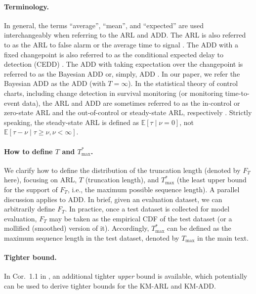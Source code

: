 \documentclass{article}
\theoremstyle{plain}
\theoremstyle{definition}
\theoremstyle{remark}
\def\mbe{\mathbb{E}}
\begin{document}
\paragraph{Terminology.}
In general, the terms ``average'', ``mean'', and ``expected'' are used interchangeably when referring to the ARL and ADD. 
The ARL is also referred to as the ARL to false alarm \citep{tartakovsky2019sequential_TartarBookQCD} or the average time to signal \citep{li2014computation}.
The ADD with a fixed changepoint is also referred to as the conditional expected delay to detection (CEDD) \citep{tartakovsky2019sequential_TartarBookQCD}.
The ADD with taking expectation over the changepoint is referred to as the Bayesian ADD or, simply, ADD \citep{tartakovsky2019sequential_TartarBookQCD}.
In our paper, we refer the Bayesian ADD as the ADD (with $T=\infty$).
In the statistical theory of control charts, including change detection in survival monitoring (or monitoring time-to-event data), the ARL and ADD are sometimes referred to as the in-control or zero-state ARL and the out-of-control or steady-state ARL, respectively \citep{saccucci1990average, sasikumr2025comprehensive, lim2025efficient}.
Strictly speaking, the steady-state ARL is defined as $\mbe[\tau \mid \nu=0]$, not $\mbe[\tau - \nu \mid \tau \geq \nu, \nu < \infty]$.

\paragraph{How to define $T$ and $T_{\mathrm{max}}^{*}$.}
We clarify how to define the distribution of the truncation length (denoted by $F_T$ here), focusing on ARL, $T$ (truncation length), and $T_{\mathrm{max}}^{*}$ (the least upper bound for the support of $F_T$, i.e., the maximum possible sequence length).
A parallel discussion applies to ADD.
In brief, given an evaluation dataset, we can arbitrarily define $F_T$.
In practice, once a test dataset is collected for model evaluation, $F_T$ may be taken as the empirical CDF of the test dataset (or a mollified (smoothed) version of it).
Accordingly, $T_{\mathrm{max}}^{*}$ can be defined as the maximum sequence length in the test dataset, denoted by $T_{\mathrm{max}}$ in the main text.

\paragraph{Tighter bound.}
In Cor.~1.1 in \citep{stute1994bias}, an additional tighter \textit{upper} bound is available, which potentially can be used to derive tighter bounds for the KM-ARL and KM-ADD. 
\end{document}

